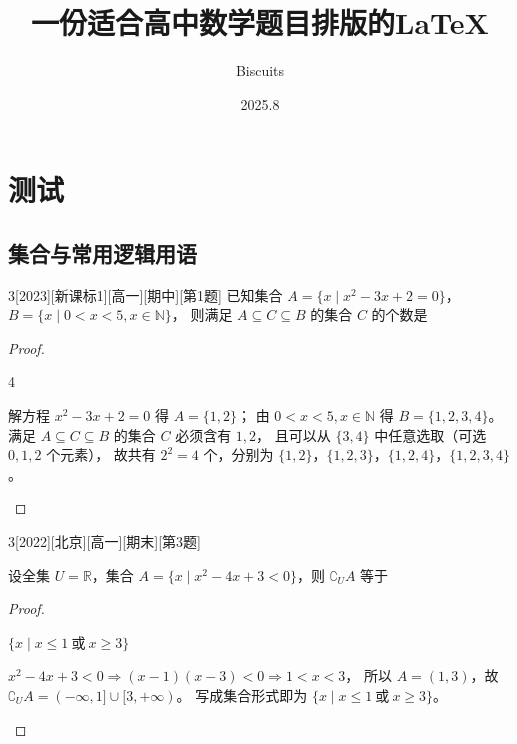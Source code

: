 \documentclass[
showanswers,             %
answercolor=red,      %
numbercolor=purple      %
]{biscuits}
\begin{document}
\title{ 一份适合高中数学题目排版的\LaTeX}
\author{Biscuits}
\date{2025.8}
\maketitle

\tableofcontents
\newpage

\chapter{测试}
\section{集合与常用逻辑用语}
\begin{example}{3}[2023][新课标1][高一][期中][第1题]
	已知集合 $A=\{x\mid x^2-3x+2=0\}$，$B=\{x\mid 0<x<5, x\in\mathbb{N}\}$，
	则满足 $A\subseteq C\subseteq B$ 的集合 $C$ 的个数是 \blankline
	\begin{proof}
		
		\begin{answer}
			4
		\end{answer}
		\begin{solutions}
			解方程 $x^2-3x+2=0$ 得 $A=\{1,2\}$；
			由 $0<x<5, x\in\mathbb{N}$ 得 $B=\{1,2,3,4\}$。
			满足 $A\subseteq C\subseteq B$ 的集合 $C$ 必须含有 $1,2$，
			且可以从 $\{3,4\}$ 中任意选取（可选 $0,1,2$ 个元素），
			故共有 $2^2=4$ 个，分别为 $\{1,2\}$，$\{1,2,3\}$，$\{1,2,4\}$，$\{1,2,3,4\}$。
		\end{solutions}
	\end{proof}
\end{example}

\begin{example}{3}[2022][北京][高一][期末][第3题]
	
设全集 $U=\mathbb{R}$，集合 $A=\{x\mid x^2-4x+3<0\}$，则 $\complement_U A$ 等于\blankline
	\begin{proof}
		
		\begin{answer}
			$\{x\mid x\le 1\ \text{或}\ x\ge 3\}$
		\end{answer}
		\begin{solutions}
			$x^2-4x+3<0 \Rightarrow (x-1)(x-3)<0 \Rightarrow 1<x<3$，
			所以 $A=(1,3)$，故 $\complement_U A = (-\infty,1]\cup[3,+\infty)$。
			写成集合形式即为 $\{x\mid x\le 1\ \text{或}\ x\ge 3\}$。
		\end{solutions}
	\end{proof}
\end{example}
\end{document}
